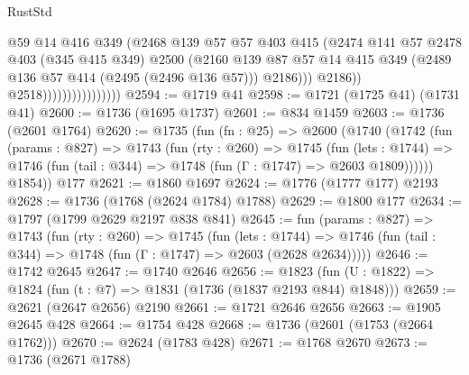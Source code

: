 \begin{lexlean}{RustStd}
\begin{coremodule}
                                        @59
                                        @14
                                        @416
                                        @349
                                        (@2468
                                          @139
                                          @57
                                          @57
                                          @403
                                          @415
                                          (@2474
                                            @141
                                            @57
                                            @2478
                                            @403
                                            (@345 @415 @349)
                                            @2500
                                            (@2160
                                              @139
                                              @87
                                              @57
                                              @14
                                              @415
                                              @349
                                              (@2489 @136 @57 @414 (@2495 (@2496 @136 @57)))
                                              @2186)))
                                        @2186))
                                    @2518))))))))))))))))
@2594 := @1719 @41
@2598 := @1721 (@1725 @41) (@1731 @41)
@2600 := @1736 (@1695 @1737)
@2601 := @834 @1459
@2603 := @1736 (@2601 @1764)
@2620 := @1735
    (fun (fn : @25) =>
    @2600
      (@1740
        (@1742
          (fun (params : @827) =>
          @1743
            (fun (rty : @260) =>
            @1745
              (fun (lets : @1744) =>
              @1746 (fun (tail : @344) => @1748 (fun (Γ : @1747) => @2603 @1809))))))
        @1854))
    @177
@2621 := @1860 @1697
@2624 := @1776 (@1777 @177) @2193
@2628 := @1736 (@1768 (@2624 @1784) @1788)
@2629 := @1800 @177
@2634 := @1797 (@1799 @2629 @2197 @838 @841)
@2645 := fun (params : @827) =>
  @1743
    (fun (rty : @260) =>
    @1745
      (fun (lets : @1744) =>
      @1746 (fun (tail : @344) => @1748 (fun (Γ : @1747) => @2603 (@2628 @2634)))))
@2646 := @1742 @2645
@2647 := @1740 @2646
@2656 := @1823 (fun (U : @1822) => @1824 (fun (t : @7) => @1831 (@1736 (@1837 @2193 @844) @1848)))
@2659 := @2621 (@2647 @2656) @2190
@2661 := @1721 @2646 @2656
@2663 := @1905 @2645 @428
@2664 := @1754 @428
@2668 := @1736 (@2601 (@1753 (@2664 @1762)))
@2670 := @2624 (@1783 @428)
@2671 := @1768 @2670
@2673 := @1736 (@2671 @1788)

\end{coremodule}
\end{lexlean}
